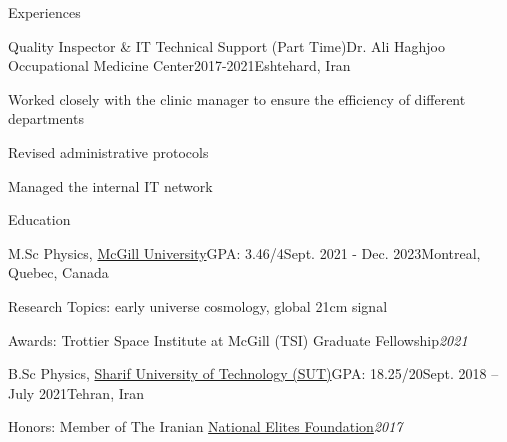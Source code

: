 \documentclass[]{kyvernitis-resume}
\begin{document}
\begin{section}{Experiences}
    \begin{subsection}
        {Quality Inspector \& IT Technical Support (Part Time)}{Dr. Ali Haghjoo Occupational Medicine Center}{2017-2021}{Eshtehard, Iran}
        \item Worked closely with the clinic manager to ensure the efficiency of different departments
        \item Revised administrative protocols
        \item Managed the internal IT network 
    \end{subsection} 
   
\end{section}
\vspace{-0.3mm}
\begin{section}{Education}
    \begin{subsection}{M.Sc Physics, \href{https://www.physics.mcgill.ca/}{McGill University}}{GPA: 3.46/4}{Sept. 2021 - Dec. 2023}{Montreal, Quebec, Canada}
        \item{Research Topics: early universe cosmology, global 21cm signal}
        \item{Awards: Trottier Space Institute at McGill (TSI) Graduate Fellowship}{\hfill \textit{2021}}
    \end{subsection}
\vspace{-0.3mm}    
    \begin{subsection}{B.Sc Physics, \href{http://physics.sharif.ir/~phyweb/}{ Sharif University of Technology (SUT)}}{GPA: 18.25/20}{Sept. 2018 – July 2021}{Tehran, Iran}
        \item{Honors: Member of The Iranian \href{https://en.bmn.ir/}{National Elites Foundation}}{\hfill \textit{2017}}
    \end{subsection}
\end{section}
\end{document}
